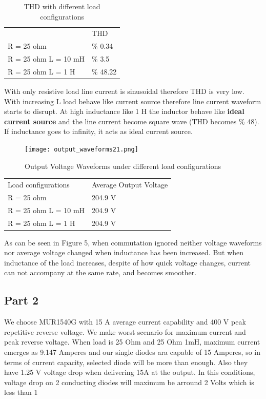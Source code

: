 \documentclass[fleqn, a4paper]{report}
\begin{document}
\begin{table}[H]
\centering
\begin{tabular}{ll}
                      & THD      \\
R = 25 ohm            & \% 0.34  \\
R = 25 ohm L  = 10 mH & \% 3.5   \\
R = 25 ohm L = 1 H    & \% 48.22
\end{tabular}
\caption{THD with different load configurations}
\end{table} 

With only resistive load line current is sinusoidal therefore THD is very low. With increasing L load behave like current source therefore line current waveform starts to disrupt. At high inductance like 1 H the inductor behave like \textbf{ideal current source} and the line current become square wave (THD becomes \% 48).  If inductance goes to infinity, it acts as ideal current source.


\begin{figure}[H]
  \texttt{[image: output\_waveforms21.png]}
  \caption{Output Voltage Waveforms under different load configurations}
  \label{fig:simulink2}
\end{figure}

\begin{table}[H]
\centering
\begin{tabular}{ll}
Load configurations    & Average Output Voltage \\
R = 25 ohm            & 204.9 V                \\
R = 25 ohm L  = 10 mH & 204.9 V                \\
R = 25 ohm L = 1 H    & 204.9 V               
\end{tabular}
\end{table}

As can be seen in Figure 5, when commutation ignored neither voltage waveforms nor average voltage changed when inductance has been increased. But when inductance of the load increases, despite of how quick voltage changes, current can not accompany at the same rate, and becomes smoother.

\subsection*{Part 2}
We choose MUR1540G with 15 A average current capability and 400 V peak repetitive reverse voltage. We make worst scenario for maximum current and peak reverse voltage. 
When load is 25 Ohm and 25 Ohm 1mH, maximum current emerges as 9.147 Amperes and our single diodes ara capable of 15 Amperes, so in terms of current capacity, selected diode will be more than enough. Also they have 1.25 V voltage drop when delivering 15A at the output. In this conditions, voltage drop on 2 conducting diodes will maximum be arround 2 Volts which is less than 1%
\end{document}

